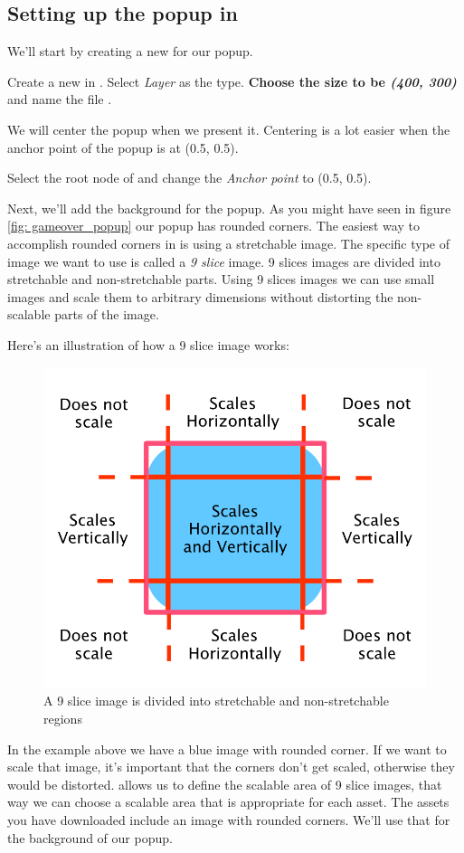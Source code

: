 \subsection{Setting up the popup in \SB{}}
We'll start by creating a new \ccbfile{} for our popup.
\begin{leftbar}
Create a new \ccbfile{} in \SB{}. Select \textit{Layer} as the type.
\textbf{Choose the size to be \textit{(400, 300)}} and name the file
.
\end{leftbar}
We will center the popup when we present it. Centering is a lot easier when the
anchor point of the popup is at (0.5, 0.5).
\begin{leftbar}
Select the root node of  and change the
\textit{Anchor point} to (0.5, 0.5).
\end{leftbar} 
Next, we'll add the background for the popup. As you might have seen in figure
\ref{fig: gameover_popup} our popup has rounded corners. The easiest way to
accomplish rounded corners in \cocos{} is using a stretchable image.
 The specific type of image we want to use is called a \textit{9 slice} image. 9
 slices images are divided into stretchable and non-stretchable parts. Using 9 slices images we can
use small images and scale them to arbitrary dimensions without distorting the
non-scalable parts of the image.

Here's an illustration of how a 9 slice image works:
\begin{figure}[H]
    \centering
    \includegraphics[width=0.5\linewidth]{images/Chapter7/9_slice.png}
    \caption{A 9 slice image is divided into stretchable and non-stretchable
    regions}
\end{figure}

In the example above we have a blue image with rounded corner. If we want to
scale that image, it's important that the corners don't get scaled, otherwise
they would be distorted. \SB{} allows us to define the scalable area of 9 slice
images, that way we can choose a scalable area that is appropriate for each
asset. The assets you have downloaded include an image with rounded corners.
We'll use that for the background of our popup.

